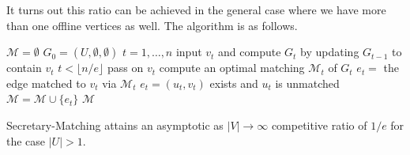 It turns out this ratio can be achieved in the general case where we have more than one offline vertices as well. The algorithm is as follows.

\begin{codebox}
    \li $\mathcal{M} = \emptyset$
    \li $G_0 = (U,\emptyset,\emptyset)$
    \li \For $t = 1,\ldots,n$ \Do
        \li input $v_t$ and compute $G_t$ by updating $G_{t-1}$ to contain $v_t$
        \li \If $t < \lfloor n/e \rfloor$ \Then
            \li pass on $v_t$
        \li \Else
            \li compute an optimal matching $\mathcal{M}_t$ of $G_t$
            \li $e_t = $ the edge matched to $v_t$ via $\mathcal{M}_t$
            \li \If $e_t = (u_t, v_t)$ exists and $u_t$ is unmatched \Then
                \li $\mathcal{M} = \mathcal{M} \cup \{e_t\}$
            \End
        \End
    \End
    \li \Return $\mathcal{M}$  
\end{codebox}

\begin{theorem}
    Secretary-Matching attains an asymptotic as $|V| \to \infty$ competitive ratio of $1/e$ for the case $|U| > 1$.
\end{theorem}

